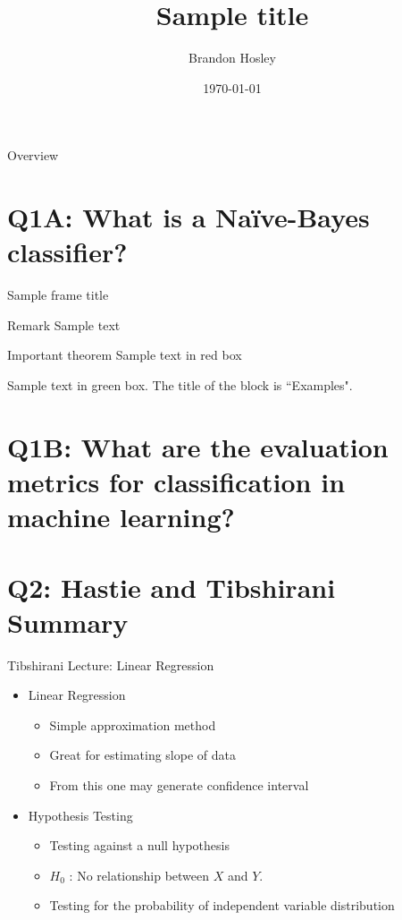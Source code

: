 \documentclass{beamer}
\title{Sample title}
\author{Brandon Hosley}
\institute{University of Illinois - Springfield}
\date{\today}
\begin{document}
\frame{\titlepage}

\begin{frame}{Overview}
\tableofcontents
\end{frame}

\section[Q1.1]{Q1A: What is a Na\"{i}ve-Bayes classifier?}

\begin{frame}{Sample frame title}
\begin{block}{Remark}
	Sample text
\end{block}

\begin{alertblock}{Important theorem}
	Sample text in red box
\end{alertblock}

\begin{examples}
	Sample text in green box. The title of the block is ``Examples".
\end{examples}

\end{frame}

\section[Q1.2]{Q1B: What are the evaluation metrics for classification in machine learning?}

\section[Q2]{Q2: Hastie and Tibshirani Summary}

\begin{frame}{Tibshirani Lecture: Linear Regression}
\begin{itemize}
	\item<1-> Linear Regression
	\begin{itemize}
		\item<1-> Simple approximation method
		\item<1-> Great for estimating slope of data
		\item<1-> From this one may generate confidence interval
	\end{itemize}
	\item<2> Hypothesis Testing
	\begin{itemize}
		\item<2> Testing against a null hypothesis
		\item<2>[] $H_0$ : No relationship between $X$ and $Y$.
		\item<2> Testing for the probability of independent variable distribution 
	\end{itemize}
\end{itemize}
\end{frame}
\end{document}
